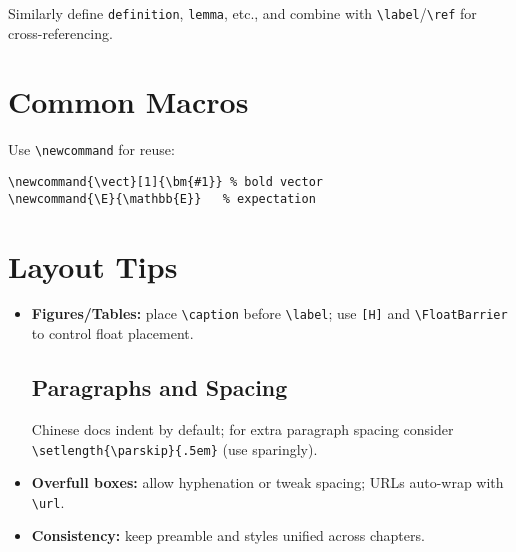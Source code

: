 \documentclass[11pt]{article}
\begin{document}
\noindent Similarly define \verb|definition|, \verb|lemma|, etc., and combine with \verb|\label|/\verb|\ref| for cross-referencing.

\section{Common Macros}
Use \verb|\newcommand| for reuse:
\begin{lstlisting}[style=code,caption={Macros}]
\newcommand{\vect}[1]{\bm{#1}} % bold vector
\newcommand{\E}{\mathbb{E}}   % expectation
\end{lstlisting}

\section{Layout Tips}
\begin{itemize}
\subsection{Common Packages}
\begin{itemize}
  \item \texttt{amsmath, amssymb, amsthm}: math and theorem environments.
  \item \texttt{bm}: bold math symbols (e.g., \verb|\bm{x}|).
  \item \texttt{graphicx}: images; \verb|\includegraphics|.
  \item \texttt{caption, float, placeins}: captions and float placement (\verb|[H]|, \verb|\FloatBarrier|).
  \item \texttt{listings}: code blocks; unified style in preamble.
  \item \texttt{booktabs}: beautiful tables (\verb|\toprule|/\verb|\midrule|/\verb|\bottomrule|).
  \item \texttt{subcaption}: subfigures (\verb|subfigure| environment).
\end{itemize}
  \item \textbf{Figures/Tables:} place \verb|\caption| before \verb|\label|; use \verb|[H]| and \verb|\FloatBarrier| to control float placement.
\subsection{Paragraphs and Spacing}
Chinese docs indent by default; for extra paragraph spacing consider \verb|\setlength{\parskip}{.5em}| (use sparingly).
  \item \textbf{Overfull boxes:} allow hyphenation or tweak spacing; URLs auto-wrap with \verb|\url|.
  \item \textbf{Consistency:} keep preamble and styles unified across chapters.
\end{itemize}
\end{document}

